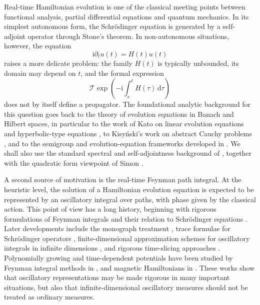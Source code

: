 \documentclass[11pt]{amsart}
\theoremstyle{plain}
\theoremstyle{definition}
\theoremstyle{remark}
\newcommand{\ii}{\mathrm i}
\newcommand{\dd}{\,\mathrm d}
\begin{document}
Real-time Hamiltonian evolution is one of the classical meeting points
between functional analysis, partial differential equations and quantum
mechanics.  In its simplest autonomous form, the Schr\"odinger equation
is generated by a self-adjoint operator through Stone's theorem.  In
non-autonomous situations, however, the equation
\[
        \ii\partial_t u(t)=H(t)u(t)
\]
raises a more delicate problem: the family \(H(t)\) is typically
unbounded, its domain may depend on \(t\), and the formal expression
\[
        \mathcal T\exp\left(-\ii\int_s^t H(\tau)\dd\tau\right)
\]
does not by itself define a propagator.  The foundational analytic
background for this question goes back to the theory of evolution
equations in Banach and Hilbert spaces, in particular to the work of
Kato on linear evolution equations and hyperbolic-type equations
\cite{Kato1953,Kato1956,Kato1970,Kato1973,KatoBook}, to Kisy\'nski's
work on abstract Cauchy problems \cite{Kisynski1964}, and to the
semigroup and evolution-equation frameworks developed in
\cite{Yosida1980,Tanabe1979,Pazy1983}.  We shall also use the standard
spectral and self-adjointness background of \cite{ReedSimon1,
ReedSimon2,ReedSimon4}, together with the quadratic form viewpoint of
Simon \cite{Simon1971,Simon1971Annals}.

A second source of motivation is the real-time Feynman path integral.
At the heuristic level, the solution of a Hamiltonian evolution equation
is expected to be represented by an oscillatory integral over paths,
with phase given by the classical action.  This point of view has a long
history, beginning with rigorous formulations of Feynman integrals and
their relation to Schr\"odinger equations
\cite{Nelson1964,AlbeverioHoeghKrohn1976}.  Later developments include
the monograph treatment \cite{AlbeverioHoeghKrohnMazzucchi2008,
Mazzucchi2009}, trace formulae for Schr\"odinger operators
\cite{AlbeverioBlanchardHoeghKrohn1982,
AlbeverioBoutetBrzezniak1996}, finite-dimensional approximation
schemes for oscillatory integrals in infinite dimensions
\cite{AlbeverioBrzezniak1993,AlbeverioBrzezniak1995}, and rigorous
time-slicing approaches
\cite{Fujiwara1979,Fujiwara1980,Fujiwara2017}.  Polynomially growing
and time-dependent potentials have been studied by Feynman integral
methods in \cite{AlbeverioMazzucchi2005,
AlbeverioMazzucchi2005CRAS,AlbeverioMazzucchi2006}, and magnetic
Hamiltonians in \cite{AlbeverioCangiottiMazzucchi2019}.  These works
show that oscillatory representations may be made rigorous in many
important situations, but also that infinite-dimensional oscillatory
measures should not be treated as ordinary measures.
\end{document}
